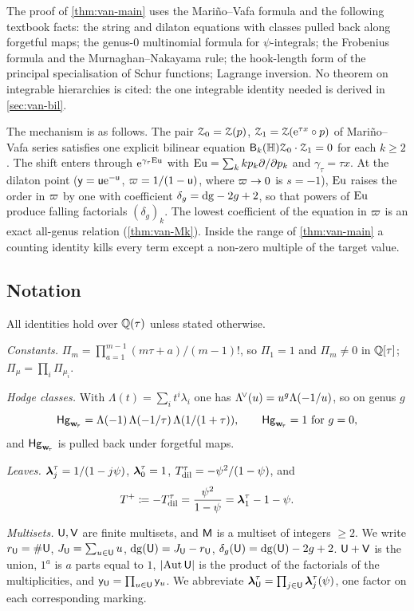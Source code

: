 The proof of \cref{thm:van-main} uses the Mari\~no--Vafa formula \cite[eq.~(1)--(3)]{LLZ03} and the following textbook facts: the string and dilaton equations with classes pulled back along forgetful maps; the genus-$0$ multinomial formula for $\psi$-integrals; the Frobenius formula and the Murnaghan--Nakayama rule; the hook-length form of the principal specialisation of Schur functions; Lagrange inversion. No theorem on integrable hierarchies is cited: the one integrable identity needed is derived in \cref{sec:van-bil}.

The mechanism is as follows. The pair $\mathcal{Z}_0=\mathcal{Z}(p)$, $\mathcal{Z}_1=\mathcal{Z}(\mathrm{e}^{\tau x}\circ p)$ of Mari\~no--Vafa series satisfies one explicit bilinear equation $\mathsf{B}_k(\mathbb{H})\mathcal{Z}_0\cdot\mathcal{Z}_1=0$ for each $k\geq 2$. The shift enters through $\mathrm{e}^{\gamma_\tau\mathrm{Eu}}$ with $\mathrm{Eu}=\sum_k kp_k\partial/\partial p_k$ and $\gamma_\tau=\tau x$. At the dilaton point ($\mathsf{y}=\mathsf{u}\mathrm{e}^{-\mathsf{u}}$, $\varpi=1/(1-\mathsf{u})$, where $\varpi\to 0$ is $s=-1$), $\mathrm{Eu}$ raises the order in $\varpi$ by one with coefficient $\delta_g=\mathrm{dg}-2g+2$, so that powers of $\mathrm{Eu}$ produce falling factorials $(\delta_g)_k$. The lowest coefficient of the equation in $\varpi$ is an exact all-genus relation (\cref{thm:van-Mk}). Inside the range of \cref{thm:van-main} a counting identity kills every term except a non-zero multiple of the target value.

\subsection{Notation}
\label{sec:van-notation}

All identities hold over $\mathbb{Q}(\tau)$ unless stated otherwise.

\emph{Constants.} $\Pi_m=\prod_{a=1}^{m-1}(m\tau+a)/(m-1)!$, so $\Pi_1=1$ and $\Pi_m\neq 0$ in $\mathbb{Q}[\tau]$; $\Pi_\mu=\prod_i\Pi_{\mu_i}$.

\emph{Hodge classes.} With $\Lambda(t)=\sum_i t^i\lambda_i$ one has $\Lambda^{\!\vee}(u)=u^g\Lambda(-1/u)$, so on genus $g$
\[
\mathsf{Hg}_{\mathbf{w}_{\!\tau}}=\Lambda(-1)\,\Lambda(-1/\tau)\,\Lambda(1/(1+\tau)),\qquad \mathsf{Hg}_{\mathbf{w}_{\!\tau}}=1\text{ for }g=0,
\]
and $\mathsf{Hg}_{\mathbf{w}_{\!\tau}}$ is pulled back under forgetful maps.

\emph{Leaves.} $\boldsymbol{\lambda}^{\tau}_j=1/(1-j\psi)$, $\boldsymbol{\lambda}^{\tau}_0=1$, $T_{\mathrm{dil}}^{\tau}=-\psi^2/(1-\psi)$, and
\[
T^{+}\coloneqq-T_{\mathrm{dil}}^{\tau}=\frac{\psi^2}{1-\psi}=\boldsymbol{\lambda}^{\tau}_1-1-\psi.
\]

\emph{Multisets.} $\mathsf{U},\mathsf{V}$ are finite multisets, and $\mathsf{M}$ is a multiset of integers $\geq 2$. We write $r_{\mathsf{U}}=\#\mathsf{U}$, $J_{\mathsf{U}}=\sum_{u\in\mathsf{U}}u$, $\mathrm{dg}(\mathsf{U})=J_{\mathsf{U}}-r_{\mathsf{U}}$, $\delta_g(\mathsf{U})=\mathrm{dg}(\mathsf{U})-2g+2$. $\mathsf{U}+\mathsf{V}$ is the union, $1^a$ is $a$ parts equal to $1$, $\lvert\operatorname{Aut}\mathsf{U}\rvert$ is the product of the factorials of the multiplicities, and $\mathsf{y}_{\mathsf{U}}=\prod_{u\in\mathsf{U}}\mathsf{y}_u$. We abbreviate $\boldsymbol{\lambda}^{\tau}_{\mathsf{U}}=\prod_{j\in\mathsf{U}}\boldsymbol{\lambda}^{\tau}_j(\psi)$, one factor on each corresponding marking.

